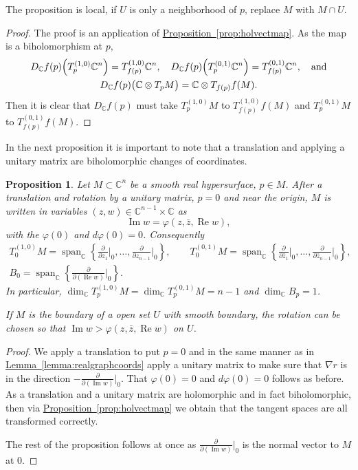 \documentclass[12pt,openany]{book}
\renewcommand{\Re}{\operatorname{Re}}
\renewcommand{\Im}{\operatorname{Im}}
\newcommand{\C}{{\mathbb{C}}}
\theoremstyle{plain}
\newtheorem{prop}[thm]{Proposition}
\theoremstyle{remark}
\theoremstyle{definition}
\theoremstyle{exercise}
\theoremstyle{example}
\newcommand{\propref}[1]{\hyperref[#1]{Proposition~\ref*{#1}}}
\newcommand{\lemmaref}[1]{\hyperref[#1]{Lemma~\ref*{#1}}}
\begin{document}
The proposition is local, if $U$ is only a neighborhood of $p$,
replace $M$ with $M \cap U$.

\begin{proof}
The proof is an application of \propref{prop:holvectmap}.
As the map is a biholomorphism at $p$,
\begin{multline*}
D_\C f(p)\Bigl(T_p^{(1,0)}\C^n\Bigr) = T_{f(p)}^{(1,0)}\C^n, \quad 
D_\C f(p)\Bigl(T_p^{(0,1)}\C^n\Bigr) = T_{f(p)}^{(0,1)}\C^n, \quad
\text{and} \\
D_\C f(p)\bigl(\C \otimes T_pM\bigr) =\C \otimes  T_{f(p)}f(M) .
\end{multline*}
Then it is clear that $D_\C f(p)$ must take
$T_p^{(1,0)}M$ to $T_{f(p)}^{(1,0)}f(M)$ and
$T_p^{(0,1)}M$ to $T_{f(p)}^{(0,1)}f(M)$.
\end{proof}

In the next proposition it is important to note that a translation and
applying a unitary matrix are biholomorphic changes of coordinates.

\pagebreak[2]
\begin{prop} \label{prop:graphcoordinatesCn}
Let $M \subset \C^n$ be a smooth real hypersurface, $p \in M$.
After a translation and rotation by a unitary
matrix, $p=0$ and near the origin,
$M$ is written in variables $(z,w) \in \C^{n-1}
\times \C$ as
\begin{equation*}
\Im w = \varphi(z,\bar{z},\Re w) ,
\end{equation*}
with the $\varphi(0)$  and $d\varphi(0) = 0$.  Consequently
\begin{gather*}
T_0^{(1,0)} M
= \operatorname{span}_{\C} \left\{
\frac{\partial}{\partial z_1}\Big|_0,
\ldots,
\frac{\partial}{\partial z_{n-1}}\Big|_0 \right\} ,
\qquad
T_0^{(0,1)} M
= \operatorname{span}_{\C} \left\{
\frac{\partial}{\partial \bar{z}_1}\Big|_0,
\ldots,
\frac{\partial}{\partial \bar{z}_{n-1}}\Big|_0 \right\} ,
\\
B_0 = \operatorname{span}_{\C} \left\{
\frac{\partial}{\partial (\Re w)}\Big|_0 \right\} .
\end{gather*}
In particular,
$\dim_\C T_p^{(1,0)} M = \dim_\C T_p^{(0,1)} M = n-1$ and 
$\dim_\C B_p = 1$.

If $M$ is the boundary of a open set $U$ with smooth boundary,
the rotation can be chosen so that
$\Im w > \varphi(z,\bar{z},\Re w)$ on $U$.
\pagebreak[2]
\end{prop}

\begin{proof}
We apply a translation to put $p=0$ and in the
same manner as in \lemmaref{lemma:realgraphcoords}
apply a unitary matrix to make sure that $\nabla r$ is
in the direction
$-\frac{\partial}{\partial (\Im w)}\big|_0$.  That $\varphi(0) = 0$
and $d\varphi(0) = 0$ follows as before.
As a translation and a unitary matrix are holomorphic
and in fact biholomorphic, then
via \propref{prop:holvectmap} we obtain that the tangent spaces are all
transformed correctly.

The rest of the proposition follows at once as
$\frac{\partial}{\partial (\Im w)}\big|_0$ is the normal vector to $M$
at $0$.
\end{proof}
\end{document}
